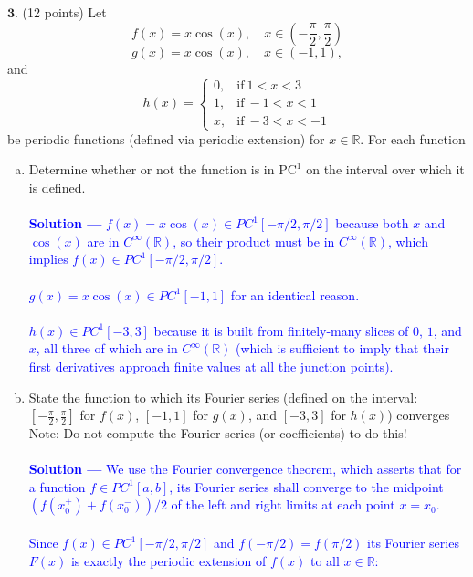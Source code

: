 \documentclass[12pt]{article}
\begin{document}
\vspace{0.3in}


\noindent $\textbf{3}$. (12 points) Let 
$$f(x) = x\cos(x), \quad x \in \left (-\frac{\pi}{2},\frac{\pi}{2} \right )$$
$$g(x) = x\cos(x), \quad x \in (-1,1),$$
and
$$h(x) =
\begin{cases}
	0, & \mathrm{if} \ 1 < x < 3 \\ 
	1, & \mathrm{if} \ -1 < x < 1 \\ 
	x, & \mathrm{if} \ -3 < x < -1
\end{cases}$$
be periodic functions (defined via periodic extension) for $x \in \mathbb{R}$.
For each function
\begin{enumerate}[(a)]
\item Determine whether or not the function is in $\mathrm{PC}^1$ on the interval over which it is defined. \\  \\
\textcolor{blue}{\textbf{Solution —} $f(x) = x\cos(x) \in PC^1[-\pi/2, \pi/2]$ because both $x$ and $\cos(x)$ are in $C^{\infty}(\mathbb{R})$, so their product must be in $C^{\infty}(\mathbb{R})$, which implies $f(x) \in PC^1[-\pi/2, \pi/2]$. \\ \\ $g(x) = x\cos(x) \in PC^1[-1, 1]$ for an identical reason. \\ \\ $h(x) \in PC^1[-3, 3]$ because it is built from finitely-many slices of $0$, $1$, and $x$, all three of which are in $C^{\infty}(\mathbb{R})$ (which is sufficient to imply that their first derivatives approach finite values at all the junction points).}
\item State the function to which its Fourier series (defined on the interval: $\left [-\frac{\pi}{2},\frac{\pi}{2} \right ]$ for $f(x)$, $[-1,1]$ for $g(x)$, and $[-3,3]$ for $h(x)$) converges\\
Note: Do not compute the Fourier series (or coefficients) to do this! \\ \\
\textcolor{blue}{\textbf{Solution —} We use the Fourier convergence theorem, which asserts that for a function $f \in PC^1[a,b]$, its Fourier series shall converge to the midpoint $(f(x_0^+) + f(x_0^-))/2$ of the left and right limits at each point $x=x_0$. \\ \\ Since $f(x) \in PC^1[-\pi/2, \pi/2]$ and $f(-\pi/2) = f(\pi/2)$ its Fourier series $F(x)$ is exactly the periodic extension of $f(x)$ to all $x\in\mathbb{R}$: 
}
\end{enumerate}
\end{document}
